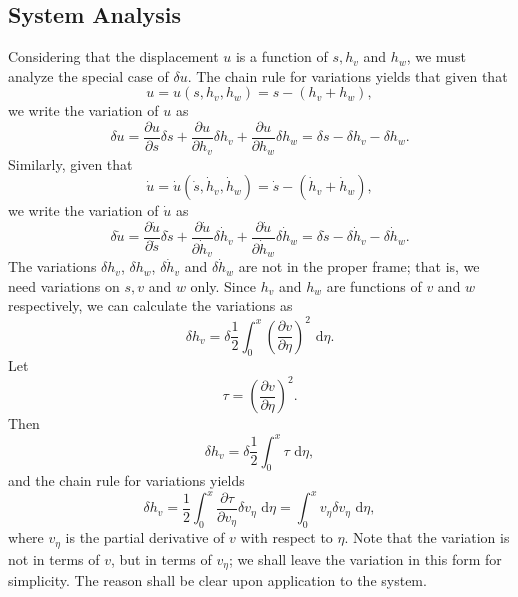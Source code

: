 \subsection{System Analysis}
Considering that the displacement $u$ is a function of $s,h_v$ and $h_w$, we must analyze the special case of $\delta u$. The chain rule for variations yields that given that
\begin{equation}
u = u(s,h_v,h_w) = s-(h_v+h_w),
\end{equation}
we write the variation of $u$ as
\begin{equation}
\delta u = \frac{\partial u}{\partial s}\delta s+\frac{\partial u}{\partial h_v}\delta h_v+\frac{\partial u}{\partial h_w}\delta h_w = \delta s - \delta h_v - \delta h_w.
\label{eq:variation.u}
\end{equation}
Similarly, given that
\begin{equation}
\dot{u} = \dot{u}(\dot s,\dot h_v, \dot h_w) = \dot s - (\dot h_v+\dot h_w),
\end{equation}
we write the variation of $\dot u$ as
\begin{equation}
\delta \dot u = \frac{\partial \dot u}{\partial \dot s}\delta \dot s+\frac{\partial \dot u}{\partial \dot h_v}\delta \dot h_v+\frac{\partial \dot u}{\partial \dot h_w}\delta \dot h_w = \delta \dot s - \delta \dot h_v - \delta \dot h_w.
\end{equation}
The variations $\delta h_v$, $\delta h_w$, $\delta \dot h_v$ and $\delta \dot h_w$ are not in the proper frame; that is, we need variations on $s,v$ and $w$ only. Since $h_v$ and $h_w$ are functions of $v$ and $w$ respectively, we can calculate the variations as
\begin{equation}
\delta h_v = \delta \frac{1}{2} \int_0^x\left(\frac{\partial v}{\partial \eta}\right)^2\text{ d}\eta.
\end{equation}
Let 
\begin{equation}
\tau = \left(\frac{\partial v}{\partial \eta}\right)^2.
\end{equation}
Then
\begin{equation}
\delta h_v = \delta \frac{1}{2} \int_0^x \tau \text{ d}\eta,
\end{equation}
and the chain rule for variations yields
\begin{equation}
\delta h_v = \frac{1}{2}\int_0^x \frac{\partial \tau}{\partial v_{\eta}}\delta v_{\eta}\text{ d}\eta = \int_0^xv_{\eta}\delta v_{\eta}\text{ d}\eta,
\end{equation}
where $v_{\eta}$ is the partial derivative of $v$ with respect to $\eta$. Note that the variation is not in terms of $v$, but in terms of $v_{\eta}$; we shall leave the variation in this form for simplicity. The reason shall be clear upon application to the system.

